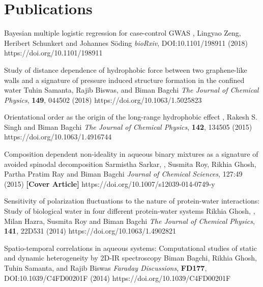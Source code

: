 \section{Publications}
%
        {Bayesian multiple logistic regression for case-control GWAS}
        {\selfauthor{}, Lingyao Zeng, Heribert Schunkert and Johannes S\"oding}
        {{\slshape bioRxiv}, DOI:10.1101/198911 (2018)}
        {https://doi.org/10.1101/198911}

%
        {Study of distance dependence of hydrophobic force between two graphene-like walls and a signature of pressure induced structure formation in the confined water}
        {Tuhin Samanta, Rajib Biswas, \selfauthor{} and Biman Bagchi}
        {{\slshape The Journal of Chemical Physics}, {\bfseries 149}, 044502 (2018)}
        {https://doi.org/10.1063/1.5025823}

%
        {Orientational order as the origin of the long-range hydrophobic effect}
        {\selfauthor{}, Rakesh S. Singh and Biman Bagchi}
        {{\slshape The Journal of Chemical Physics}, {\bfseries 142}, 134505 (2015)}
        {https://doi.org/10.1063/1.4916744}

%
        {Composition dependent non-ideality in aqueous binary mixtures
        as a signature of avoided spinodal decomposition}
        {Sarmistha Sarkar, \selfauthor{}, Susmita Roy, Rikhia Ghosh, Partha Pratim Ray and Biman Bagchi}
        {{\slshape Journal of Chemical Sciences}, 127:49 (2015) {\bfseries [Cover Article]}}
        {https://doi.org/10.1007/s12039-014-0749-y}

%
        {Sensitivity of polarization fluctuations to the nature of protein-water interactions:
        Study of biological water in four different protein-water systems}
        {Rikhia Ghosh, \selfauthor{}, Milan Hazra, Susmita Roy and Biman Bagchi}
        {{\slshape The Journal of Chemical Physics}, {\bfseries 141}, 22D531 (2014)}
        {https://doi.org/10.1063/1.4902821}

%
        {Spatio-temporal correlations in aqueous systems:
         Computational studies of static and dynamic heterogeneity by 2D-IR spectroscopy}
        {Biman Bagchi, Rikhia Ghosh, Tuhin Samanta, \selfauthor{} and Rajib Biswas}
        {{\slshape Faraday Discussions}, {\bfseries FD177}, DOI:10.1039/C4FD00201F (2014)}
        {https://doi.org/10.1039/C4FD00201F}

